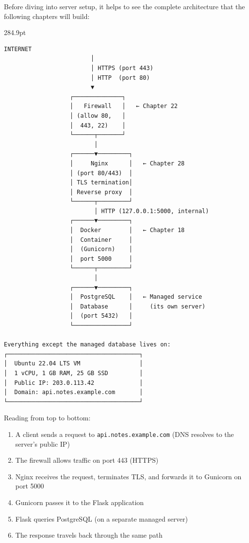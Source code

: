 Before diving into server setup, it helps to see the complete architecture that the following chapters will build:

\begin{diagrambox}[short]{284.9pt}
\begin{Verbatim}[fontsize=\fontsize{9.0}{8.55}\selectfont]
                     INTERNET
                         │
                         │ HTTPS (port 443)
                         │ HTTP  (port 80)
                         ▼
                   ┌──────────────┐
                   │   Firewall   │   ← Chapter 22
                   │ (allow 80,   │
                   │  443, 22)    │
                   └──────┬───────┘
                          │
                   ┌──────▼─────────┐
                   │     Nginx      │   ← Chapter 28
                   │ (port 80/443)  │
                   │ TLS termination│
                   │ Reverse proxy  │
                   └──────┬─────────┘
                          │ HTTP (127.0.0.1:5000, internal)
                   ┌──────▼─────────┐
                   │  Docker        │   ← Chapter 18
                   │  Container     │
                   │  (Gunicorn)    │
                   │  port 5000     │
                   └──────┬─────────┘
                          │
                   ┌──────▼─────────┐
                   │  PostgreSQL    │   ← Managed service
                   │  Database      │     (its own server)
                   │  (port 5432)   │
                   └────────────────┘

Everything except the managed database lives on:
┌──────────────────────────────────────┐
│  Ubuntu 22.04 LTS VM                 │
│  1 vCPU, 1 GB RAM, 25 GB SSD         │
│  Public IP: 203.0.113.42             │
│  Domain: api.notes.example.com       │
└──────────────────────────────────────┘
\end{Verbatim}
\end{diagrambox}

\noindent{}Reading from top to bottom:

\begin{enumerate}
\def\labelenumi{\arabic{enumi}.}
\tightlist
\item
  A client sends a request to \texttt{api.notes.example.com} (DNS resolves to the server's public IP)
\item
  The firewall allows traffic on port 443 (HTTPS)
\item
  Nginx receives the request, terminates TLS, and forwards it to Gunicorn on port 5000
\item
  Gunicorn passes it to the Flask application
\item
  Flask queries PostgreSQL (on a separate managed server)
\item
  The response travels back through the same path
\end{enumerate}

